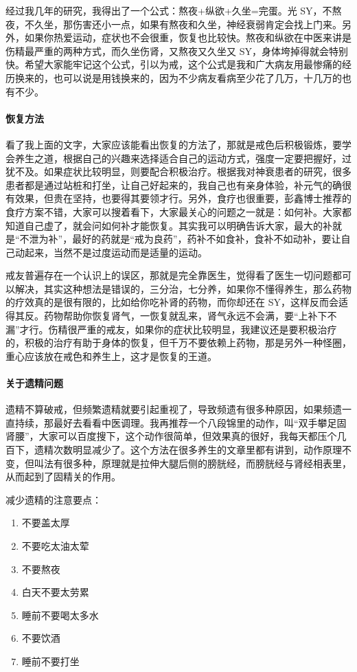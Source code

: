 \documentclass[fontset=founder]{ctexart}
\begin{document}
经过我几年的研究，我得出了一个公式：熬夜+纵欲+久坐=完蛋。光 SY，不熬夜，不久坐，那伤害还小一点，如果有熬夜和久坐，神经衰弱肯定会找上门来。另外，如果你热爱运动，症状也不会很重，恢复也比较快。熬夜和纵欲在中医来讲是伤精最严重的两种方式，而久坐伤肾，又熬夜又久坐又 SY，身体垮掉得就会特别快。希望大家能牢记这个公式，引以为戒，这个公式是我和广大病友用最惨痛的经历换来的，也可以说是用钱换来的，因为不少病友看病至少花了几万，十几万的也有不少。

\paragraph{恢复方法}

看了我上面的文字，大家应该能看出恢复的方法了，那就是戒色后积极锻炼，要学会养生之道，根据自己的兴趣来选择适合自己的运动方式，强度一定要把握好，过犹不及。如果症状比较明显，则要配合积极治疗。根据我对神衰患者的研究，很多患者都是通过站桩和打坐，让自己好起来的，我自己也有亲身体验，补元气的确很有效果，但贵在坚持，也要得其要领才行。另外，食疗也很重要，彭鑫博士推荐的食疗方案不错，大家可以搜着看下，大家最关心的问题之一就是：如何补。大家都知道自己虚了，就会问如何补才能恢复。其实我可以明确告诉大家，最大的补就是“不泄为补”，最好的药就是“戒为良药”，药补不如食补，食补不如动补，要让自己动起来，当然不是过度运动而是适量的运动。

戒友普遍存在一个认识上的误区，那就是完全靠医生，觉得看了医生一切问题都可以解决，其实这种想法是错误的，三分治，七分养，如果你不懂得养生，那么药物的疗效真的是很有限的，比如给你吃补肾的药物，而你却还在 SY，这样反而会适得其反。药物帮助你恢复肾气，一恢复就乱来，肾气永远不会满，要“上补下不漏”才行。伤精很严重的戒友，如果你的症状比较明显，我建议还是要积极治疗的，积极的治疗有助于身体的恢复，但千万不要依赖上药物，那是另外一种怪圈，重心应该放在戒色和养生上，这才是恢复的王道。

\paragraph{关于遗精问题}

遗精不算破戒，但频繁遗精就要引起重视了，导致频遗有很多种原因，如果频遗一直持续，那最好去看看中医调理。我再推荐一个八段锦里的动作，叫“双手攀足固肾腰”，大家可以百度搜下，这个动作很简单，但效果真的很好，我每天都压个几百下，遗精次数明显减少了。这个方法在很多养生的文章里都有讲到，动作原理不变，但叫法有很多种，原理就是拉伸大腿后侧的膀胱经，而膀胱经与肾经相表里，从而起到了固精关的作用。

减少遗精的注意要点：
\begin{enumerate}
    \item 不要盖太厚
    \item 不要吃太油太荤
    \item 不要熬夜
    \item 白天不要太劳累
    \item 睡前不要喝太多水
    \item 不要饮酒
    \item 睡前不要打坐
\end{enumerate}
\end{document}
